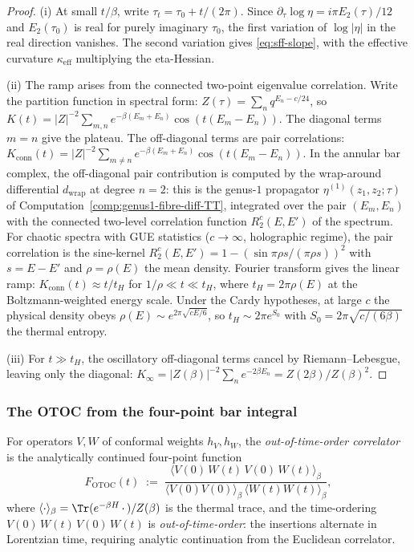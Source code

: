 \begin{proof}
(i) At small $t/\beta$, write
$\tau_t=\tau_0+t/(2\pi)$. Since
$\partial_\tau\log\eta=i\pi E_2(\tau)/12$ and $E_2(\tau_0)$ is
real for purely imaginary $\tau_0$, the first variation of
\(\log|\eta|\) in the real direction vanishes. The second variation
gives \eqref{eq:sff-slope}, with the effective curvature
\(\kappa_{\mathrm{eff}}\) multiplying the eta-Hessian.

(ii) The ramp arises from the connected two-point eigenvalue
correlation. Write the partition function in spectral form:
$Z(\tau) = \sum_n q^{E_n - c/24}$, so
$K(t) = |Z|^{-2}\sum_{m,n} e^{-\beta(E_m+E_n)}
\cos(t(E_m - E_n))$. The diagonal terms $m = n$ give the
plateau. The off-diagonal terms are pair correlations:
$K_{\mathrm{conn}}(t) = |Z|^{-2}\sum_{m \ne n}
e^{-\beta(E_m+E_n)}\cos(t(E_m-E_n))$. In the annular bar
complex, the off-diagonal pair contribution is computed by the
wrap-around differential $d_{\mathrm{wrap}}$ at degree $n = 2$:
this is the genus-$1$ propagator
$\eta^{(1)}(z_1,z_2;\tau)$ of
Computation~\ref{comp:genus1-fibre-diff-TT}, integrated over
the pair $(E_m, E_n)$ with the connected two-level correlation
function $R_2^c(E,E')$ of the spectrum. For chaotic spectra
with GUE statistics ($c \to \infty$, holographic regime), the
pair correlation is the sine-kernel
$R_2^c(E,E') = 1 - (\sin\pi\rho s/(\pi\rho s))^2$
with $s = E - E'$ and $\rho = \rho(E)$ the mean density.
Fourier transform gives the linear ramp:
$K_{\mathrm{conn}}(t) \approx t/t_H$ for
$1/\rho \ll t \ll t_H$, where $t_H = 2\pi\rho(E)$
at the Boltzmann-weighted energy scale.
Under the Cardy hypotheses, at large \(c\) the physical density obeys
$\rho(E) \sim e^{2\pi\sqrt{cE/6}}$, so
$t_H \sim 2\pi e^{S_0}$ with $S_0 = 2\pi\sqrt{c/(6\beta)}$
the thermal entropy.

(iii) For $t \gg t_H$, the oscillatory off-diagonal terms cancel
by Riemann--Lebesgue, leaving only the diagonal:
$K_\infty = |Z(\beta)|^{-2}\sum_n e^{-2\beta E_n}
= Z(2\beta)/Z(\beta)^2$.
\end{proof}

\subsubsection*{The OTOC from the four-point bar integral}

\begin{definition}
\label{def:otoc}%
%
For operators $V, W$ of conformal weights $h_V, h_W$, the
\emph{out-of-time-order correlator} is the analytically
continued four-point function
\begin{equation}\label{eq:otoc-definition}
F_{\mathrm{OTOC}}(t)
\;:=\;
\frac{\langle V(0)\,W(t)\,V(0)\,W(t)\rangle_\beta}
 {\langle V(0)V(0)\rangle_\beta\,
 \langle W(t)W(t)\rangle_\beta},
\end{equation}
where $\langle\cdot\rangle_\beta
= \Tr(e^{-\beta H}\,\cdot\,)/Z(\beta)$ is the thermal trace,
and the time-ordering $V(0)\,W(t)\,V(0)\,W(t)$ is
\emph{out-of-time-order}: the insertions alternate in
Lorentzian time, requiring analytic continuation from the
Euclidean correlator.
\end{definition}

